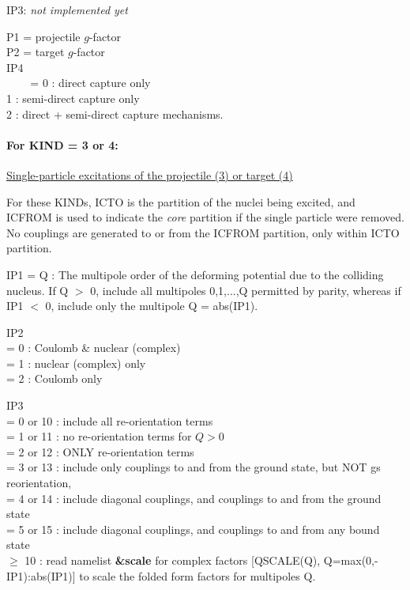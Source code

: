 \documentclass[11pt]{article}
\begin{document}
\begin{description}
 IP3:  {\em not implemented yet}


 P1  = projectile $g$-factor  \\
 P2  = target $g$-factor  \\

IP4 \\
~  ~~   = 0 : direct capture only
\\    1 : semi-direct capture only
\\    2 : direct + semi-direct capture mechanisms.


\paragraph{For KIND = 3 or 4:} 
\underline{Single-particle excitations of the projectile (3) or target (4)}


 For these KINDs, ICTO is the partition of the nuclei being excited,
and ICFROM is used to indicate the
{\em core} partition if the single particle were removed.  No couplings are
generated to or from the ICFROM partition, only within ICTO partition.

 IP1 = Q : The multipole order of the deforming potential due to
the colliding nucleus. If Q $>$ 0, include all multipoles 0,1,...,Q
permitted by parity, whereas if IP1 $<$ 0, include only the multipole
Q = abs(IP1).
%

IP2
\\   = 0 : Coulomb \& nuclear (complex)
\\  = 1 : nuclear (complex) only
\\  = 2 : Coulomb only



IP3
\\  = 0 or 10 : include all re-orientation terms
\\  = 1 or 11 : no re-orientation terms for $Q > 0$
\\  = 2 or 12 : ONLY re-orientation terms
\\  = 3 or 13 : include only couplings to and from the ground state,
    but NOT gs reorientation,
\\  = 4 or 14 : include diagonal couplings,
                and  couplings to and from the ground state
\\  = 5 or 15 : include diagonal couplings,
                and  couplings to and from any bound state
\\  $\geq$ 10      : read namelist {\bf \&scale} for
complex factors [QSCALE(Q), Q=max(0,-IP1):abs(IP1)]
to scale the folded form factors for multipoles Q.


\end{description}
\end{document}
